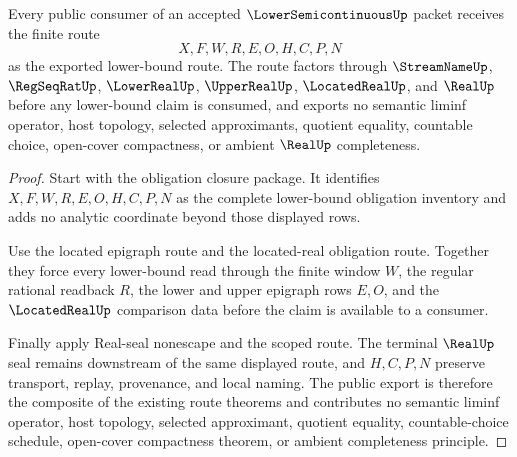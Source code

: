 \begin{theorem}
\label{thm:lower-semicontinuous-public-route-export}
Every public consumer of an accepted $\LowerSemicontinuousUp$ packet receives the finite route
$$
X,F,W,R,E,O,H,C,P,N
$$
as the exported lower-bound route. The route factors through $\StreamNameUp$, $\RegSeqRatUp$, $\LowerRealUp$, $\UpperRealUp$, $\LocatedRealUp$, and $\RealUp$ before any lower-bound claim is consumed, and exports no semantic liminf operator, host topology, selected approximants, quotient equality, countable choice, open-cover compactness, or ambient $\RealUp$ completeness.
\end{theorem}
\begin{proof}
Start with the obligation closure package. It identifies $X,F,W,R,E,O,H,C,P,N$ as the complete lower-bound obligation inventory and adds no analytic coordinate beyond those displayed rows.

Use the located epigraph route and the located-real obligation route. Together they force every lower-bound read through the finite window $W$, the regular rational readback $R$, the lower and upper epigraph rows $E,O$, and the $\LocatedRealUp$ comparison data before the claim is available to a consumer.

Finally apply Real-seal nonescape and the scoped route. The terminal $\RealUp$ seal remains downstream of the same displayed route, and $H,C,P,N$ preserve transport, replay, provenance, and local naming. The public export is therefore the composite of the existing route theorems and contributes no semantic liminf operator, host topology, selected approximant, quotient equality, countable-choice schedule, open-cover compactness theorem, or ambient completeness principle.
\end{proof}


